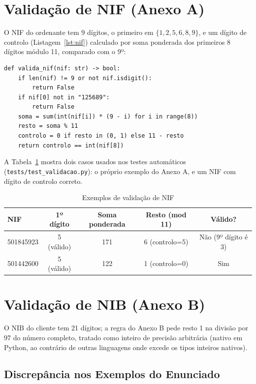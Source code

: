 \documentclass[11pt,a4paper]{report}
\begin{document}
\section{Validação de NIF (Anexo A)}

O NIF do ordenante tem 9 dígitos, o primeiro em $\{1,2,5,6,8,9\}$, e um
dígito de controlo (Listagem~\ref{lst:nif}) calculado por soma ponderada dos
primeiros 8 dígitos módulo 11, comparado com o 9º:

\begin{lstlisting}[caption={Validação de NIF (\texttt{ps2/validacao.py})},label=lst:nif]
def valida_nif(nif: str) -> bool:
    if len(nif) != 9 or not nif.isdigit():
        return False
    if nif[0] not in "125689":
        return False
    soma = sum(int(nif[i]) * (9 - i) for i in range(8))
    resto = soma % 11
    controlo = 0 if resto in (0, 1) else 11 - resto
    return controlo == int(nif[8])
\end{lstlisting}

A Tabela~\ref{tab:nif-exemplos} mostra dois casos usados nos testes
automáticos (\texttt{tests/test\_validacao.py}): o próprio exemplo do
Anexo A, e um NIF com dígito de controlo correto.

\begin{table}[H]\centering
  \begin{tabular}{lcccc}
    \textbf{NIF} & \textbf{1º dígito} & \textbf{Soma ponderada} & \textbf{Resto (mod 11)} & \textbf{Válido?} \\ \hline
    501845923 & 5 (válido) & 171 & 6 (controlo=5) & Não (9º dígito é 3) \\
    501442600 & 5 (válido) & 122 & 1 (controlo=0) & Sim \\
  \end{tabular}
  \caption{Exemplos de validação de NIF}\label{tab:nif-exemplos}
\end{table}

\section{Validação de NIB (Anexo B)}

O NIB do cliente tem 21 dígitos; a regra do Anexo B pede resto 1 na divisão
por 97 do número completo, tratado como inteiro de precisão arbitrária
(nativo em Python, ao contrário de outras linguagens onde excede os tipos
inteiros nativos).

\subsection{Discrepância nos Exemplos do Enunciado}
\end{document}
